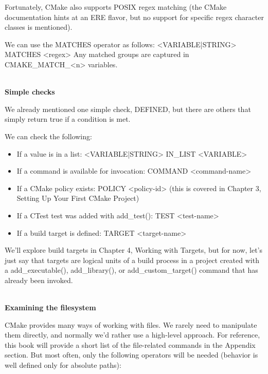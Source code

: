 Fortunately, CMake also supports POSIX regex matching (the CMake documentation hints at an ERE flavor, but no support for specific regex character classes is mentioned).

We can use the MATCHES operator as follows: <VARIABLE|STRING> MATCHES <regex> Any matched groups are captured in CMAKE\_MATCH\_<n> variables.

\hspace*{\fill} \\ %
\noindent
\textbf{Simple checks}

We already mentioned one simple check, DEFINED, but there are others that simply return true if a condition is met.

We can check the following:

\begin{itemize}
\item 
If a value is in a list: <VARIABLE|STRING> IN\_LIST <VARIABLE>

\item 
If a command is available for invocation: COMMAND <command-name>

\item 
If a CMake policy exists: POLICY <policy-id> (this is covered in Chapter 3, Setting Up Your First CMake Project)

\item 
If a CTest test was added with add\_test(): TEST <test-name>

\item 
If a build target is defined: TARGET <target-name>
\end{itemize}

We'll explore build targets in Chapter 4, Working with Targets, but for now, let's just say that targets are logical units of a build process in a project created with a add\_executable(), add\_library(), or add\_custom\_target() command that has already been invoked.

\hspace*{\fill} \\ %
\noindent
\textbf{Examining the filesystem}

CMake provides many ways of working with files. We rarely need to manipulate them directly, and normally we'd rather use a high-level approach. For reference, this book will provide a short list of the file-related commands in the Appendix section. But most often, only the following operators will be needed (behavior is well defined only for absolute paths):

